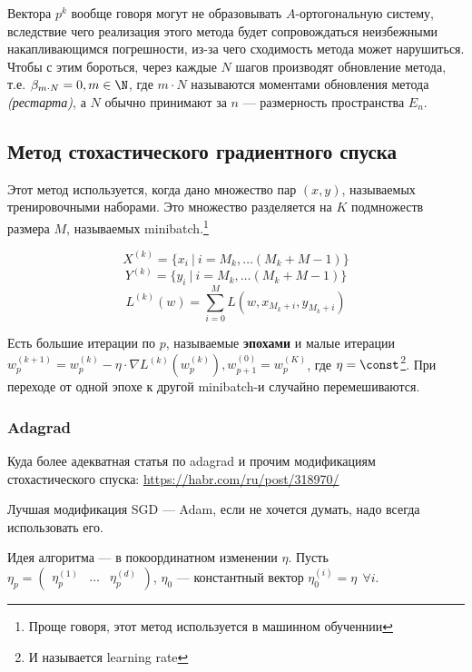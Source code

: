 Вектора \(p^k\) вообще говоря могут не образовывать \(A\)-ортогональную систему, вследствие чего реализация этого метода будет сопровождаться неизбежными накапливающимся погрешности, из-за чего сходимость метода может нарушиться. Чтобы с этим бороться, через каждые \(N\) шагов производят обновление метода, т.е. \(\beta_{m \cdot N} = 0, m\in\N\), где \(m \cdot N\) называются моментами обновления метода \textit{(рестарта)}, а \(N\) обычно принимают за \(n\) --- размерность пространства \(E_n\).

\subsection{Метод стохастического градиентного спуска}

Этот метод используется, когда дано множество пар \((x,y)\), называемых тренировочными наборами. Это множество разделяется на \(K\) подмножеств размера \(M\), называемых minibatch.\footnote{Проще говоря, этот метод используется в машинном обученнии}

\[X^{(k)} = \{x_i\ |\ i = M_k, \dots (M_k + M - 1)\}\]
\[Y^{(k)} = \{y_i\ |\ i = M_k, \dots (M_k + M - 1)\}\]
\[L^{(k)}(w) = \sum_{i = 0}^M L(w, x_{M_k + i}, y_{M_k + i})\]


Есть большие итерации по \(p\), называемые \textbf{эпохами} и малые итерации \(w_p^{(k + 1)} = w_p^{(k)} - \eta \cdot \nabla L^{(k)}(w_p^{(k)}), w_{p + 1}^{(0)} = w_p^{(K)}\), где \(\eta = \const\)\footnote{И называется learning rate}. При переходе от одной эпохе к другой minibatch-и случайно перемешиваются.

\subsubsection{Adagrad}

\begin{remark}
    Куда более адекватная статья по adagrad и прочим модификациям стохастического спуска: \href{https://habr.com/ru/post/318970/}{https://habr.com/ru/post/318970/}
\end{remark}

\begin{remark}
    Лучшая модификация SGD --- Adam, если не хочется думать, надо всегда использовать его.
\end{remark}

Идея алгоритма --- в покоординатном изменении \(\eta\). Пусть \(\eta_p = \begin{pmatrix} \eta_p^{(1)} & \dots & \eta_p^{(d)} \end{pmatrix} \), \(\eta_0\) --- константный вектор \(\eta_0^{(i)} = \eta \ \ \forall i\).

